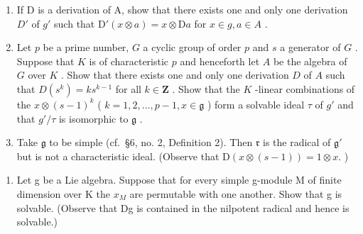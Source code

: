 \begin{enumerate}
\def\labelenumi{(\alph{enumi})}
\item
  If D is a derivation of A, show that there exists one and only one derivation \(D'\) of \(g'\) such that \(\mathrm{D}'(x \otimes a) = x \otimes \mathrm{D}a\) for \(x \in g, a \in A\) .
\item
  Let \(p\) be a prime number, \(G\) a cyclic group of order \(p\) and \(s\) a generator of \(G\) . Suppose that \(K\) is of characteristic \(p\) and henceforth let \(A\) be the algebra of \(G\) over \(K\) . Show that there exists one and only one derivation \(D\) of \(A\) such that \(D(s^k) = ks^{k-1}\) for all \(k \in \mathbf{Z}\) . Show that the \(K\) -linear combinations of the \(x \otimes (s - 1)^k\) ( \(k = 1, 2, \ldots, p - 1, x \in \mathfrak{g}\) ) form a solvable ideal \(\tau\) of \(g'\) and that \(g'/\tau\) is isomorphic to \(\mathfrak{g}\) .
\item
  Take \(\mathfrak{g}\) to be simple (cf.~§6, no. 2, Definition 2). Then \(\mathfrak{r}\) is the radical of \(\mathfrak{g}'\) but is not a characteristic ideal. (Observe that \(\mathrm{D}(x\otimes (s - 1)) = 1\otimes x.\) )
\end{enumerate}

\begin{enumerate}
\def\labelenumi{\arabic{enumi}.}
\setcounter{enumi}{16}
\tightlist
\item
  Let g be a Lie algebra. Suppose that for every simple g-module M of finite dimension over K the \(x_{M}\) are permutable with one another. Show that g is solvable. (Observe that Dg is contained in the nilpotent radical and hence is solvable.)
\end{enumerate}

